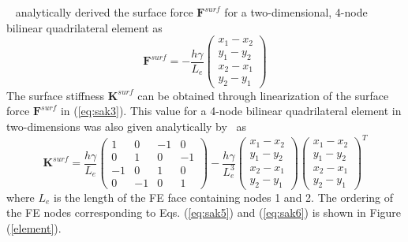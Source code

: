 \documentclass[8.5pt,twoside,twocolumn]{article}
\newcommand{\mbf}{\mathbf}
\begin{document}
~\citet{henannSM2014} analytically derived the surface force $\mbf{F}^{surf}$ for a two-dimensional, 4-node bilinear quadrilateral element as
\begin{equation}\label{eq:sak5} \mbf{F}^{surf}=-\frac{h\gamma}{L_{e}}\left(\begin{array}{cccc} {x_{1}-x_{2}} \\ {y_{1}-y_{2}} \\ {x_{2}-x_{1}} \\ {y_{2}-y_{1}} \end{array}\right)
\end{equation} 
The surface stiffness $\mbf{K}^{surf}$ can be obtained through linearization of the surface force $\mbf{F}^{surf}$ in (\ref{eq:sak3}).  This value for a 4-node bilinear quadrilateral element in two-dimensions was also given analytically by~\citet{henannSM2014} as
\begin{dmath} \label{eq:sak6} \mbf{K}^{surf}=\frac{h\gamma}{L_{e}}\left(\begin{array}{cccc} {1} & {0} & {-1} & {0} \\ {0} & {1} & {0} & {-1} \\ {-1} & {0} & {1} & {0} \\ {0} & {-1} & {0} & {1} \end{array}\right)-\frac{h\gamma}{L_{e}^{3}}\left(\begin{array}{cccc} {x_{1}-x_{2}} \\ {y_{1}-y_{2}} \\ {x_{2}-x_{1}} \\ {y_{2}-y_{1}} \end{array}\right)\left(\begin{array}{cccc} {x_{1}-x_{2}} \\ {y_{1}-y_{2}} \\ {x_{2}-x_{1}} \\ {y_{2}-y_{1}} \end{array}\right)^{T}
\end{dmath}
where $L_{e}$ is the length of the FE face containing nodes 1 and 2.  The ordering of the FE nodes corresponding to Eqs. (\ref{eq:sak5}) and (\ref{eq:sak6}) is shown in Figure (\ref{element}).  
\end{document}
